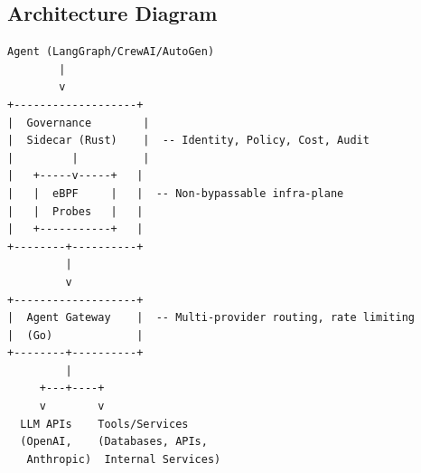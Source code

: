 \documentclass[runningheads]{llncs}
\begin{document}
\subsection{Architecture Diagram}

\begin{verbatim}
Agent (LangGraph/CrewAI/AutoGen)
        |
        v
+-------------------+
|  Governance        |
|  Sidecar (Rust)    |  -- Identity, Policy, Cost, Audit
|         |          |
|   +-----v-----+   |
|   |  eBPF     |   |  -- Non-bypassable infra-plane
|   |  Probes   |   |
|   +-----------+   |
+--------+----------+
         |
         v
+-------------------+
|  Agent Gateway    |  -- Multi-provider routing, rate limiting
|  (Go)             |
+--------+----------+
         |
     +---+----+
     v        v
  LLM APIs    Tools/Services
  (OpenAI,    (Databases, APIs,
   Anthropic)  Internal Services)
\end{verbatim}
\end{document}
